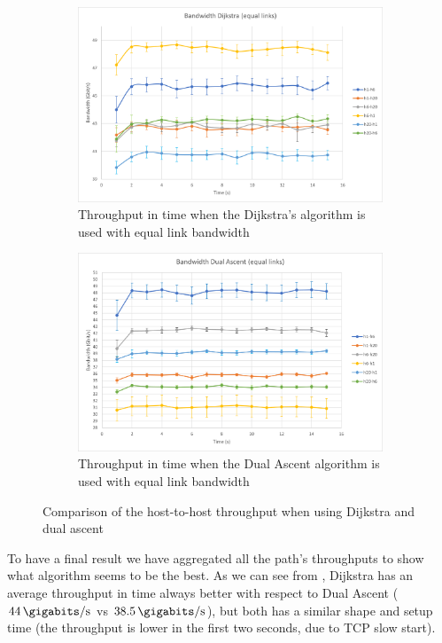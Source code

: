\begin{figure}
	\centering
	\begin{subfigure}[b]{\textwidth}
		\centering
		\includegraphics[width=\textwidth]{img/band-eq-dijkstra.png}
		\caption{Throughput in time when the Dijkstra's algorithm is
		used with equal link bandwidth}\label{subfig:band-eq-dijkstra}
	\end{subfigure}
	\begin{subfigure}[b]{\textwidth}
		\centering
		\includegraphics[width=\textwidth]{img/band-eq-dual.png}
		\caption{Throughput in time when the Dual Ascent algorithm is
		used with equal link bandwidth}\label{subfig:band-eq-dual}
	\end{subfigure}
	\caption{Comparison of the host-to-host throughput when using Dijkstra
	and dual ascent}\label{fig:bandwidth-equallinks}
\end{figure}

To have a final result we have aggregated all the path's throughputs to show
what algorithm seems to be the best. As we can see from
, Dijkstra has an average throughput in time
always better with respect to Dual Ascent (\(\SI{44}{\gigabits\per\second}\) vs
\(\SI{38.5}{\gigabits\per\second}\)), but both has a similar shape and setup time
(the throughput is lower in the first two seconds, due to TCP slow start).

